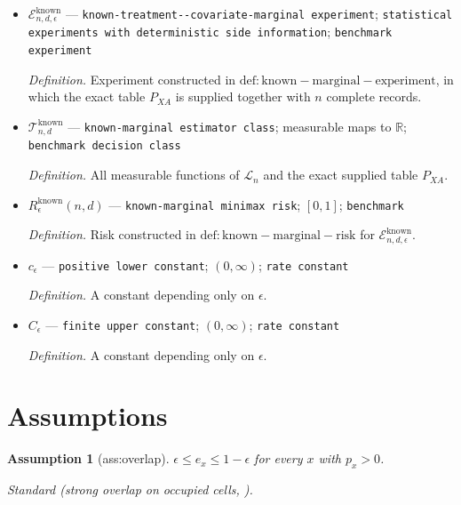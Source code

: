 \documentclass{article}
\newtheorem{assumption}{Assumption}
\begin{document}
\begin{itemize}
  \par\smallskip\noindent\emph{Definition.} The mixed-statistic and common-marginal calculation constructed in \(\mathrm{def:finite-small-instance}\).
  \item \(\mathcal E^{\mathrm{known}}_{n,d,\epsilon}\) --- \texttt{known-\allowbreak{}treatment-\allowbreak{}-\allowbreak{}covariate-\allowbreak{}marginal experiment}; \texttt{statistical experiments with deterministic side information}; \texttt{benchmark experiment}
  \par\smallskip\noindent\emph{Definition.} Experiment constructed in \(\mathrm{def:known-marginal-experiment}\), in which the exact table \(P_{XA}\) is supplied together with \(n\) complete records.
  \item \(\mathcal T^{\mathrm{known}}_{n,d}\) --- \texttt{known-\allowbreak{}marginal estimator class}; measurable maps to \(\mathbb R\); \texttt{benchmark decision class}
  \par\smallskip\noindent\emph{Definition.} All measurable functions of \(\mathcal L_n\) and the exact supplied table \(P_{XA}\).
  \item \(R_\epsilon^{\mathrm{known}}(n,d)\) --- \texttt{known-\allowbreak{}marginal minimax risk}; \([0,1]\); \texttt{benchmark}
  \par\smallskip\noindent\emph{Definition.} Risk constructed in \(\mathrm{def:known-marginal-risk}\) for \(\mathcal E^{\mathrm{known}}_{n,d,\epsilon}\).
  \item \(c_\epsilon\) --- \texttt{positive lower constant}; \((0,\infty)\); \texttt{rate constant}
  \par\smallskip\noindent\emph{Definition.} A constant depending only on \(\epsilon\).
  \item \(C_\epsilon\) --- \texttt{finite upper constant}; \((0,\infty)\); \texttt{rate constant}
  \par\smallskip\noindent\emph{Definition.} A constant depending only on \(\epsilon\).
\end{itemize}

\section{Assumptions}

\begin{assumption}[ass:overlap]\label{ass:overlap}
\(\epsilon\le e_x\le1-\epsilon\) for every \(x\) with \(p_x>0\).
\par\smallskip\noindent\emph{Standard} (strong overlap on occupied cells, \cite{ZengBalakrishnanHanKennedy2024}).
\end{assumption}
\end{document}
